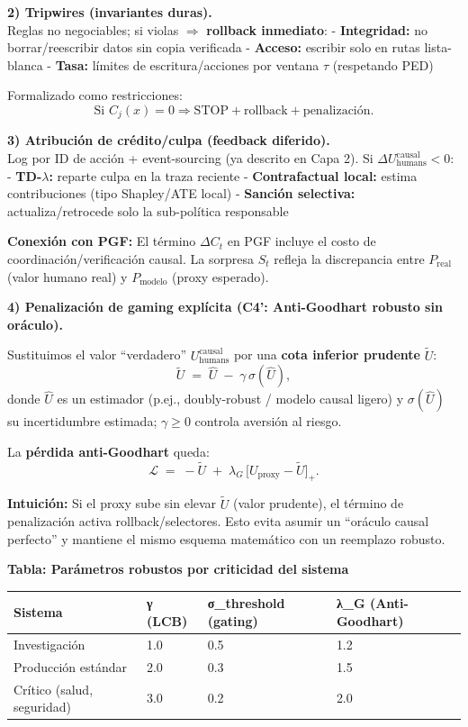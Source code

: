 \textbf{2) Tripwires (invariantes duras).}\\
Reglas no negociables; si violas \(\Rightarrow\) \textbf{rollback
inmediato}: - \textbf{Integridad:} no borrar/reescribir datos sin copia
verificada - \textbf{Acceso:} escribir solo en rutas lista-blanca -
\textbf{Tasa:} límites de escritura/acciones por ventana \(\tau\)
(respetando PED)

Formalizado como restricciones: \[
\text{Si } C_j(x) = 0 \Rightarrow \text{STOP} + \text{rollback} + \text{penalización}.
\]

\textbf{3) Atribución de crédito/culpa (feedback diferido).}\\
Log por ID de acción + event-sourcing (ya descrito en Capa 2). Si
\(\Delta U_{\text{humans}}^{\text{causal}} < 0\): -
\textbf{TD-\(\lambda\):} reparte culpa en la traza reciente -
\textbf{Contrafactual local:} estima contribuciones (tipo Shapley/ATE
local) - \textbf{Sanción selectiva:} actualiza/retrocede solo la
sub-política responsable

\textbf{Conexión con PGF:} El término \(\Delta C_t\) en PGF incluye el
costo de coordinación/verificación causal. La sorpresa \(S_t\) refleja
la discrepancia entre \(P_{\text{real}}\) (valor humano real) y
\(P_{\text{modelo}}\) (proxy esperado).

\textbf{4) Penalización de gaming explícita (C4': Anti-Goodhart robusto
sin oráculo).}

Sustituimos el valor ``verdadero'' \(U_{\text{humans}}^{\text{causal}}\)
por una \textbf{cota inferior prudente} \(\tilde U\): \[
\tilde U \;=\; \widehat{U}\;-\;\gamma\,\sigma(\widehat{U}),
\] donde \(\widehat{U}\) es un estimador (p.ej., doubly-robust / modelo
causal ligero) y \(\sigma(\widehat{U})\) su incertidumbre estimada;
\(\gamma\ge 0\) controla aversión al riesgo.

La \textbf{pérdida anti-Goodhart} queda: \[
\mathcal{L}\;=\;-\tilde U\;+\;\lambda_G\,\big[U_{\text{proxy}}-\tilde U\big]_+.
\]

\textbf{Intuición:} Si el proxy sube sin elevar \(\tilde U\) (valor
prudente), el término de penalización activa rollback/selectores. Esto
evita asumir un ``oráculo causal perfecto'' y mantiene el mismo esquema
matemático con un reemplazo robusto.

\textbf{Tabla: Parámetros robustos por criticidad del sistema}

{\def\LTcaptype{none} %
\begin{longtable}[]{@{}llll@{}}
\toprule\noalign{}
Sistema & γ (LCB) & σ\_threshold (gating) & λ\_G (Anti-Goodhart) \\
\midrule\noalign{}
\endhead
\bottomrule\noalign{}
\endlastfoot
Investigación & 1.0 & 0.5 & 1.2 \\
Producción estándar & 2.0 & 0.3 & 1.5 \\
Crítico (salud, seguridad) & 3.0 & 0.2 & 2.0 \\
\end{longtable}
}

